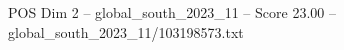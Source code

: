 \begin{textsample}{POS Dim 2 – global\_south\_2023\_11 – Score 23.00 – global\_south\_2023\_11/103198573.txt}
\end{textsample}
